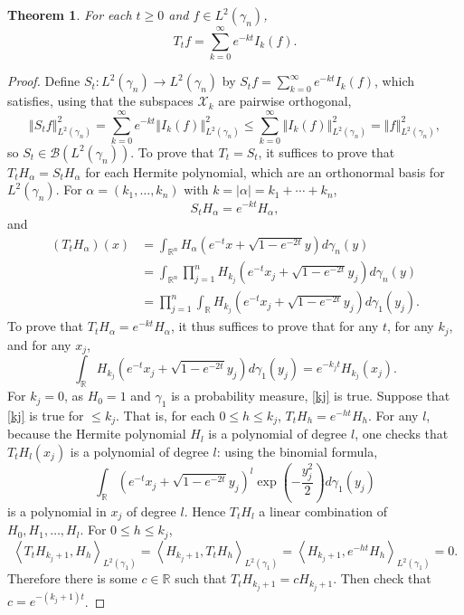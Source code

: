 \documentclass{article}
\newcommand{\inner}[2]{\left\langle #1, #2 \right\rangle}
\newcommand{\norm}[1]{\left\Vert #1 \right\Vert}
\newtheorem{theorem}{Theorem}
\theoremstyle{definition}
\begin{document}
\begin{theorem}
For each $t \geq 0$ and $f \in L^2(\gamma_n)$,
\[
T_t f = \sum_{k=0}^\infty e^{-kt} I_k(f).
\]
\label{projections}
\end{theorem}
\begin{proof}
Define $S_t:L^2(\gamma_n) \to L^2(\gamma_n)$ by $S_t f = \sum_{k=0}^\infty e^{-kt} I_k(f)$, which satisfies, using that
the subspaces $\mathcal{X}_k$ are pairwise orthogonal,
\[
\norm{S_t f}_{L^2(\gamma_n)}^2 = \sum_{k=0}^\infty e^{-kt} \norm{I_k(f)}_{L^2(\gamma_n)}^2
\leq  \sum_{k=0}^\infty \norm{I_k(f)}_{L^2(\gamma_n)}^2
=\norm{f}_{L^2(\gamma_n)}^2,
\]
so $S_t \in \mathscr{B}(L^2(\gamma_n))$. 
To prove that $T_t = S_t$, it suffices to prove that $T_t H_\alpha= S_t H_\alpha$ for each Hermite polynomial, which are
an orthonormal basis for $L^2(\gamma_n)$. 
For $\alpha=(k_1,\ldots,k_n)$ with $k=|\alpha|=k_1+\cdots+k_n$,
\[
S_t H_\alpha = e^{-kt} H_\alpha,
\]
and
\begin{align*}
(T_t H_\alpha)(x)&=\int_{\mathbb{R}^n} H_\alpha\left(e^{-t}x+\sqrt{1-e^{-2t}}y\right)d\gamma_n(y)\\
&=\int_{\mathbb{R}^n} \prod_{j=1}^n H_{k_j}\left(e^{-t}x_j+\sqrt{1-e^{-2t}}y_j\right) d\gamma_n(y)\\
&=\prod_{j=1}^n \int_{\mathbb{R}} H_{k_j}\left(e^{-t}x_j+\sqrt{1-e^{-2t}}y_j\right) d\gamma_1(y_j).
\end{align*}
To prove that $T_t H_\alpha = e^{-kt} H_\alpha$, it thus suffices to prove that for any 
$t$, for any $k_j$, and for any $x_j$,
\begin{equation}
\int_{\mathbb{R}} H_{k_j}\left(e^{-t}x_j+\sqrt{1-e^{-2t}}y_j\right) d\gamma_1(y_j) = e^{-k_j t} H_{k_j}(x_j).
\label{kj}
\end{equation}
For $k_j=0$, as $H_0=1$ and $\gamma_1$ is a probability measure, \eqref{kj} is true. 
Suppose that \eqref{kj} is true for  $\leq k_j$. That is, for each $0 \leq h \leq k_j$,
$T_t H_{h} = e^{-h t} H_{h}$. For any $l$, because the Hermite polynomial $H_l$ is a polynomial of degree
$l$, one checks that $T_t H_l(x_j)$ is a polynomial of degree $l$: using the binomial formula,
\[
\int_{\mathbb{R}} (e^{-t}x_j+\sqrt{1-e^{-2t}}y_j)^l \exp\left(-\frac{y_j^2}{2}\right) d\gamma_1(y_j)
\]
is a polynomial in $x_j$ of degree $l$. 
Hence $T_t H_l$ a linear combination of $H_0,H_1,\ldots,H_l$.  
For $0 \leq h \leq k_j$,
\[
\inner{T_t H_{k_j+1}}{H_h}_{L^2(\gamma_1)}=
\inner{H_{k_j+1}}{T_t H_h}_{L^2(\gamma_1)}
=\inner{H_{k_j+1}}{e^{-ht}H_h}_{L^2(\gamma_1)}
=0.
\]
Therefore there is some $c \in \mathbb{R}$ such that
$T_t H_{k_j+1} = c H_{k_j+1}$. Then check that
$c=e^{-(k_j+1)t}$. 
\end{proof}
\end{document}
